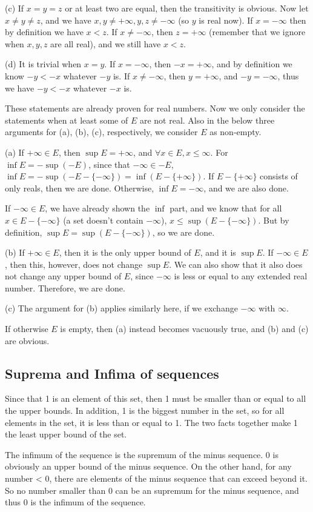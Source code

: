 (c) If $x = y = z$ or at least two are equal, then the transitivity is obvious. Now let $x \ne y \ne z$, and we have $x,y \ne + \infty, y,z \ne - \infty$ (so $y$ is real now). If $x = - \infty$  then by definition we have $x < z$. If $x \ne - \infty$, then $z = + \infty$ (remember that we ignore when $x,y,z$ are all real), and we still have $x < z$.

(d) It is trivial when $x = y$. If $x = - \infty$, then $-x = +\infty$, and by definition we know $-y< -x$ whatever $-y$ is. If $x \ne -\infty$, then $y = +\infty$, and $-y = - \infty$, thus we have $-y < -x$ whatever $-x$ is.

These statements are already proven for real numbers. Now we only consider the statements when at least some of $E$ are not real. Also in the below three arguments for (a), (b), (c), respectively, we consider $E$ as non-empty.

(a) If $+ \infty \in E$, then $\sup E = + \infty$, and $\forall x \in E, x \le \infty$. For $\inf E = - \sup (-E)$, since that $- \infty \in -E$, $\inf E = - \sup (-E - \{-\infty\}) = \inf (E - \{+ \infty\})$. If $E - \{+ \infty\}$ consists of only reals, then we are done. Otherwise, $\inf E = - \infty$, and we are also done. 

If $- \infty \in E$, we have already shown the $\inf$ part, and we know that for all $x \in E - \{-\infty\}$ (a set doesn't contain $- \infty$), $x \le \sup (E - \{-\infty\})$. But by definition, $\sup E = \sup (E - \{-\infty\})$, so we are done.

(b) If $+ \infty \in E$, then it is the only upper bound of $E$, and it is $\sup E$. If $- \infty \in E$, then this, however, does not change $\sup E$. We can also show that it also does not change any upper bound of $E$, since $- \infty$ is less or equal to any extended real number. Therefore, we are done.

(c) The argument for (b) applies similarly here, if we exchange $-\infty$ with $\infty$.

If otherwise $E$ is empty, then (a) instead becomes vacuously true, and (b) and (c) are obvious.

\subsection{Suprema and Infima of sequences}
Since that 1 is an element of this set, then 1 must be smaller than or equal to all the upper bounds. In addition, 1 is the biggest number in the set, so for all elements in the set, it is less than or equal to 1. The two facts together make 1 the least upper bound of the set.

The infimum of the sequence is the supremum of the minus sequence. 0 is obviously an upper bound of the minus sequence. On the other hand, for any number < 0, there are elements of the minus sequence that can exceed beyond it. So no number smaller than 0 can be an supremum for the minus sequence, and thus 0 is the infimum of the sequence.


